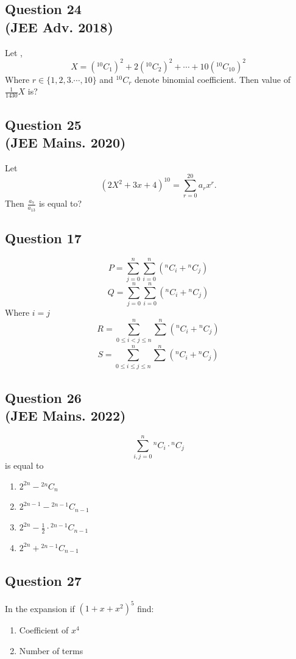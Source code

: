 \subsection*{Question 24 \\ \small(JEE Adv. 2018)}
Let , \[
X = ({}^{10}C_{1})^2+2({}^{10}C_{2})^2+\cdots+10({}^{10}C_{10})^2
\]
Where $r \in \{1,2,3.\cdots,10\} $ and ${}^{10}C_{r}$ denote binomial coefficient. Then value of $\frac{1}{1430}X$ is?

\subsection*{Question 25 \\ \small(JEE Mains. 2020)}
Let \[
(2X^2+3x+4)^{10} = \sum^{20}_{r=0}a_rx^r.
\]
Then $\frac{a_7}{a_{13}}$ is equal to?
\subsection*{Question 17}
\[ 
P = \sum_{j=0}^{n}\sum^{n}_{i=0}({}^{n}C_{i}+{}^{n}C_{j})
\]
\[
Q = \sum_{j=0}^{n}\sum^{n}_{i=0}({}^{n}C_{i}+{}^{n}C_{j}) 
\]
Where $i=j$
\[
R = {\sum^{n}_{0\leq i<j \leq n}\sum^{n}}_{}({}^{n}C_{i}+{}^{n}C_{j})
\]
\[
S = {\sum^{n}_{0\leq i \leq j \leq n}\sum^{n}}_{}({}^{n}C_{i}+{}^{n}C_{j})
\]

\subsection*{Question 26 \\ \small(JEE Mains. 2022)}
\[
\sum_{i,j=0}^{n} {}^{n}C_{i} \cdot {}^{n}C_{j} 
\] is equal to
\begin{enumerate}
    \item $2^{2n}-{}^{2n}C_{n}$
    \item $2^{2n-1}-{}^{2n-1}C_{n-1}$
    \item $2^{2n} - \frac{1}{2} \cdot{}^{2n-1}C_{n-1}$
    \item $2^{2n} + {}^{2n-1}C_{n-1}$
\end{enumerate}

\subsection*{Question 27}
In the expansion if $(1+x+x^2)^5$ find:
\begin{enumerate}
    \item Coefficient of $x^4$
    \item Number of terms
\end{enumerate}

